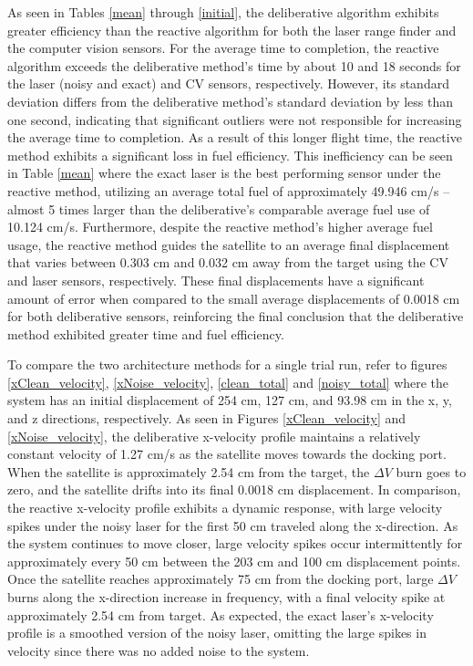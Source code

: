 \documentclass[journal, 10pt]{IEEEtran}
\begin{document}
As seen in Tables \ref{mean} through \ref{initial}, the deliberative algorithm exhibits greater efficiency than the reactive algorithm for both the laser range finder and the computer vision sensors. For the average time to completion, the reactive algorithm exceeds the deliberative method's time by about 10 and 18 seconds for the laser (noisy and exact) and CV sensors, respectively. However, its standard deviation differs from the deliberative method's standard deviation by less than one second, indicating that significant outliers were not responsible for increasing the average time to completion. As a result of this longer flight time, the reactive method exhibits a significant loss in fuel efficiency. This inefficiency can be seen in Table \ref{mean} where the exact laser is the best performing sensor under the reactive method, utilizing an average total fuel of approximately 49.946 cm/s -- almost 5 times larger than the deliberative's comparable average fuel use of 10.124 cm/s. Furthermore, despite the reactive method's higher average fuel usage, the reactive method guides the satellite to an average final displacement that varies between 0.303 cm and 0.032 cm away from the target using the CV and laser sensors, respectively. These final displacements have a significant amount of error when compared to the small average displacements of 0.0018 cm for both deliberative sensors, reinforcing the final conclusion that the deliberative method exhibited greater time and fuel efficiency.

To compare the two architecture methods for a single trial run, refer to figures \ref{xClean_velocity}, \ref{xNoise_velocity}, \ref{clean_total} and \ref{noisy_total} where the system has an initial displacement of 254 cm, 127 cm, and 93.98 cm in the x, y, and z directions, respectively. As seen in Figures \ref{xClean_velocity} and \ref{xNoise_velocity}, the deliberative x-velocity profile maintains a relatively constant velocity of 1.27 cm/s as the satellite moves towards the docking port. When the satellite is approximately 2.54 cm from the target, the $\Delta V$ burn goes to zero, and the satellite drifts into its final 0.0018 cm displacement. In comparison, the reactive x-velocity profile exhibits a dynamic response, with large velocity spikes under the noisy laser for the first 50 cm traveled along the x-direction. As the system continues to move closer, large velocity spikes occur intermittently for approximately every 50 cm between the 203 cm and 100 cm displacement points. Once the satellite reaches approximately 75 cm from the docking port, large $\Delta V$ burns along the x-direction increase in frequency, with a final velocity spike at approximately 2.54 cm from target. As expected, the exact laser's x-velocity profile is a smoothed version of the noisy laser, omitting the large spikes in velocity since there was no added noise to the system.
\end{document}
